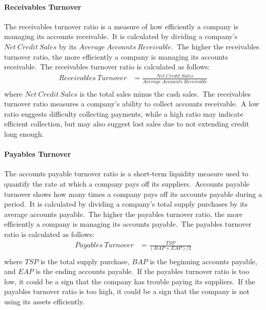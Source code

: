 \documentclass[../xlapes02]{subfiles}
\begin{document}
    \paragraph{Receivables Turnover}\label{par:receivables-turnover}
    The receivables turnover ratio is a measure of how efficiently a company is managing its accounts receivable.\ It is calculated by dividing a company's $Net\ Credit\ Sales$ by its $Average\ Accounts\ Receivable$.\ The higher the receivables turnover ratio, the more efficiently a company is managing its accounts receivable.\ The receivables turnover ratio is calculated as follows:
    \begin{equation}
        \label{eq:receivables-turnover}
        \begin{split}
            Receivables\ Turnover&=\frac{Net\ Credit\ Sales}{Average\ Accounts\ Receivable}\\
        \end{split}
    \end{equation}
    where $Net\ Credit\ Sales$ is the total sales minus the cash sales.\ The receivables turnover ratio measures a company's ability to collect accounts receivable.\ A low ratio suggests difficulty collecting payments, while a high ratio may indicate efficient collection, but may also suggest lost sales due to not extending credit long enough.

    \paragraph{Payables Turnover}\label{par:payables-turnover}
    The accounts payable turnover ratio is a short-term liquidity measure used to quantify the rate at which a company pays off its suppliers.\ Accounts payable turnover shows how many times a company pays off its accounts payable during a period.\ It is calculated by dividing a company's total supply purchases by its average accounts payable.\ The higher the payables turnover ratio, the more efficiently a company is managing its accounts payable.\ The payables turnover ratio is calculated as follows:
    \begin{equation}
        \label{eq:payables-turnover}
        \begin{split}
            Payables\ Turnover&=\frac{TSP}{(BAP+EAP)/2}\\
        \end{split}
    \end{equation}
    where $TSP$ is the total supply purchase, $BAP$ is the beginning accounts payable, and $EAP$ is the ending accounts payable.\ If the payables turnover ratio is too low, it could be a sign that the company has trouble paying its suppliers.\ If the payables turnover ratio is too high, it could be a sign that the company is not using its assets efficiently.
\end{document}
